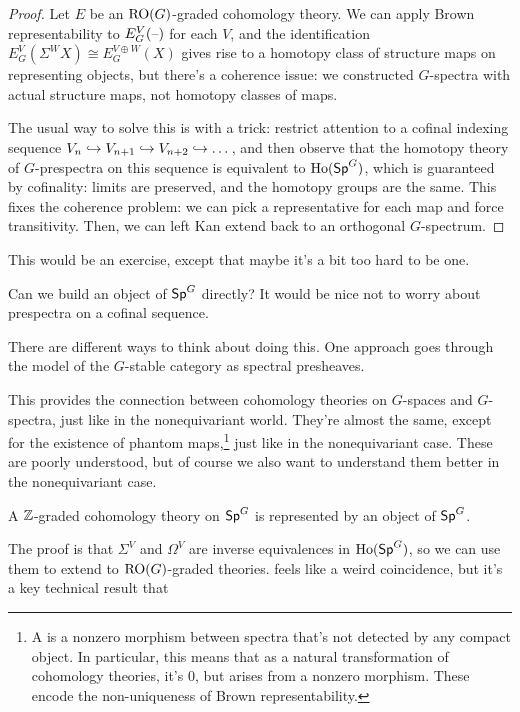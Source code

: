 \begin{proof}
Let $E$ be an $\mathrm{RO}(G)$-graded cohomology theory. We can apply Brown representability to $E_G^V(\text{--})$ for each $V$,
and the identification $E_G^V(\Sigma^W X)\cong E_G^{V\oplus W}(X)$ gives rise to a homotopy class of structure maps
on representing objects, but there's a coherence issue: we constructed $G$-spectra with actual structure maps, not
homotopy classes of maps.

The usual way to solve this is with a trick: restrict attention to a cofinal indexing sequence $V_n\hookrightarrow V_{n+1}\hookrightarrow
V_{n+2}\hookrightarrow\dots$, and then observe that the homotopy theory of $G$-prespectra on this sequence is equivalent to
$\operatorname{Ho}(\mathsf{Sp}^G)$, which is guaranteed by cofinality: limits are preserved, and the homotopy groups are the same. This
fixes the coherence problem: we can pick a representative for each map and force transitivity. Then, we can left
Kan extend back to an orthogonal $G$-spectrum.
\end{proof}
This would be an exercise, except that maybe it's a bit too hard to be one.
\begin{ques}
Can we build an object of $\mathsf{Sp}^G$ directly? It would be nice not to worry about prespectra on a cofinal sequence.

There are different ways to think about doing this. One approach goes through the model of the $G$-stable category
as spectral presheaves.
\end{ques}
This provides the connection between cohomology theories on $G$-spaces and $G$-spectra, just like in the
nonequivariant world. They're almost the same, except for the existence of phantom maps,\footnote{A
 is a nonzero morphism between spectra that's not detected by any compact object. In
particular, this means that as a natural transformation of cohomology theories, it's $0$, but arises from a nonzero
morphism. These encode the non-uniqueness of Brown representability.} just like in the nonequivariant case. These
are poorly understood, but of course we also want to understand them better in the nonequivariant case.
\begin{cor}
\label{ZtoROG}
A $\mathbb Z$-graded cohomology theory on $\mathsf{Sp}^G$ is represented by an object of $\mathsf{Sp}^G$.
\end{cor}
The proof is that $\Sigma^V$ and $\Omega^V$ are inverse equivalences in $\operatorname{Ho}(\mathsf{Sp}^G)$, so we can use them to extend
to $\mathrm{RO}(G)$-graded theories.  feels like a weird coincidence, but it's a key technical result that
